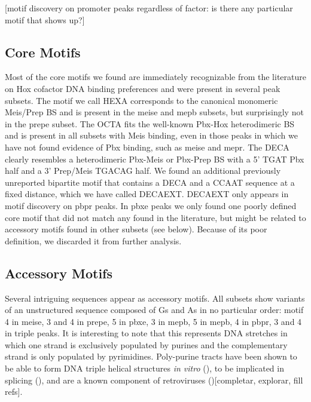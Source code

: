 [motif discovery on promoter peaks regardless of factor: is there any particular motif that shows up?]


\subsection{Core Motifs}

Most of the core motifs we found are immediately recognizable from the literature on Hox cofactor DNA binding preferences and were present in several peak subsets. The motif we call \ac{HEXA} corresponds to the canonical monomeric Meis/Prep \ac{BS} and is present in the \ac{meise} and \ac{mepb} subsets, but surprisingly not in the \ac{prepe} subset. The \ac{OCTA} fits the well-known Pbx-Hox heterodimeric \ac{BS} and is present in all subsets with Meis binding, even in those peaks in which we have not found evidence of Pbx binding, such as \ac{meise} and \ac{mepr}. The \ac{DECA} clearly resembles a heterodimeric Pbx-Meis or Pbx-Prep \ac{BS} with a 5' TGAT Pbx half and a 3' Prep/Meis TGACAG half. We found an additional previously unreported bipartite motif that contains a \ac{DECA} and a CCAAT sequence at a fixed distance, which we have called \ac{DECAEXT}. \ac{DECAEXT} only appears in motif discovery on \ac{pbpr} peaks. In \ac{pbxe} peaks we only found one poorly defined core motif that did not match any found in the literature, but might be related to accessory motifs found in other subsets (see below). Because of its poor definition, we discarded it from further analysis.

\subsection{Accessory Motifs}
\label{ssc:accessoryMotifs}

Several intriguing sequences appear as accessory motifs. All subsets show variants of an unstructured sequence composed of Gs and As in no particular order: motif 4 in \ac{meise}, 3 and 4 in \ac{prepe}, 5 in \ac{pbxe}, 3 in \ac{mepb}, 5 in \ac{mepb}, 4 in \ac{pbpr}, 3 and 4 in triple peaks. It is interesting to note that this represents DNA stretches in which one strand is exclusively populated by purines and the complementary strand is only populated by pyrimidines. Poly-purine tracts have been shown to be able to form DNA triple helical structures \textit{in vitro} (\cite{ref}), to be implicated in splicing (\cite{ref}), and are a known component of retroviruses (\cite{ref})[completar, explorar, fill refs].

